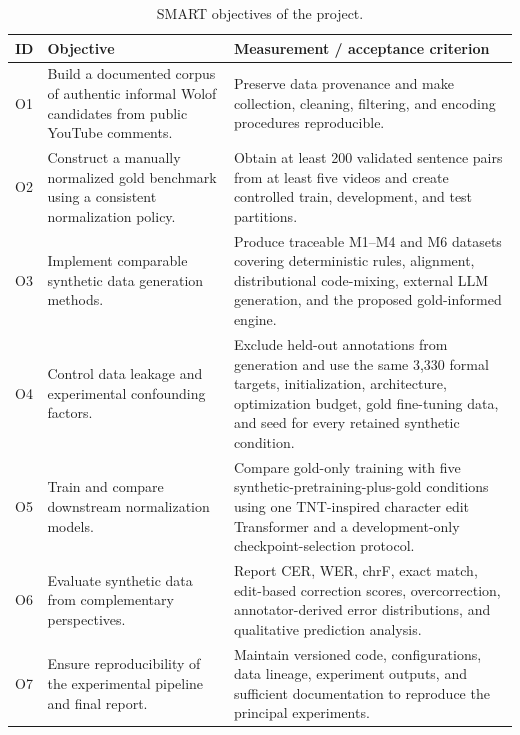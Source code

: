\documentclass[12pt, a4paper, twoside, openany]{report}
\begin{document}
\begin{table}[H]
	\centering
	\caption{SMART objectives of the project.}
	\label{tab:smart-objectives}
	\small
	\begin{tabularx}{\textwidth}{
			>{\centering\arraybackslash}p{0.7cm}
			>{\raggedright\arraybackslash}p{5.0cm}
			>{\raggedright\arraybackslash}X}
		\toprule
		\textbf{ID} & \textbf{Objective} & \textbf{Measurement / acceptance criterion} \\
		\midrule

		O1 &
		Build a documented corpus of authentic informal Wolof candidates from public YouTube comments. &
		Preserve data provenance and make collection, cleaning, filtering, and encoding procedures reproducible. \\

		\addlinespace

		O2 &
		Construct a manually normalized gold benchmark using a consistent normalization policy. &
		Obtain at least 200 validated sentence pairs from at least five videos and create controlled train, development, and test partitions. \\

		\addlinespace

	O3 &
		Implement comparable synthetic data generation methods. &
		Produce traceable M1--M4 and M6 datasets covering deterministic rules, alignment, distributional code-mixing, external LLM generation, and the proposed gold-informed engine. \\

		\addlinespace

	O4 &
		Control data leakage and experimental confounding factors. &
		Exclude held-out annotations from generation and use the same 3,330 formal targets, initialization, architecture, optimization budget, gold fine-tuning data, and seed for every retained synthetic condition. \\

		\addlinespace

	O5 &
		Train and compare downstream normalization models. &
		Compare gold-only training with five synthetic-pretraining-plus-gold conditions using one TNT-inspired character edit Transformer and a development-only checkpoint-selection protocol. \\

		\addlinespace

	O6 &
		Evaluate synthetic data from complementary perspectives. &
		Report CER, WER, chrF, exact match, edit-based correction scores, overcorrection, annotator-derived error distributions, and qualitative prediction analysis. \\

		\addlinespace

		O7 &
		Ensure reproducibility of the experimental pipeline and final report. &
		Maintain versioned code, configurations, data lineage, experiment outputs, and sufficient documentation to reproduce the principal experiments. \\

		\bottomrule
	\end{tabularx}
\end{table}
\end{document}
